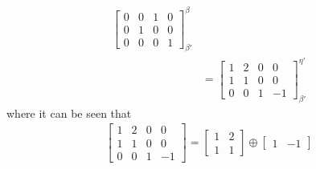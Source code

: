 \begin{solution}
\begin{align*}
\begin{bmatrix}
0 & 0 & 1 & 0 \\
0 & 1 & 0 & 0 \\
0 & 0 & 0 & 1
\end{bmatrix}_{\beta'}^\beta \\
&=
\begin{bmatrix}
1 & 2 & 0 & 0 \\
1 & 1 & 0 & 0 \\
0 & 0 & 1 & -1
\end{bmatrix}_{\beta'}^{\eta'}
\end{align*}
where it can be seen that
\begin{align*}
\begin{bmatrix}
1 & 2 & 0 & 0 \\
1 & 1 & 0 & 0 \\
0 & 0 & 1 & -1
\end{bmatrix} =
\begin{bmatrix}
1 & 2 \\
1 & 1
\end{bmatrix}
\oplus 
\begin{bmatrix}
1 & -1
\end{bmatrix}
\end{align*}
\end{solution}

